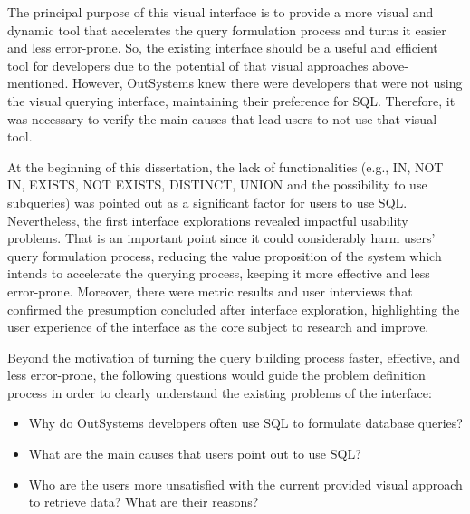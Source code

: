 The principal purpose of this visual interface is to provide a more visual and dynamic tool that accelerates the query formulation process and turns it easier and less error-prone. So, the existing interface should be a useful and efficient tool for developers due to the potential of that visual approaches above-mentioned. However, OutSystems knew there were developers that were not using the visual querying interface, maintaining their preference for SQL. Therefore, it was necessary to verify the main causes that lead users to not use that visual tool. 

At the beginning of this dissertation, the lack of functionalities (e.g., IN, NOT IN, EXISTS, NOT EXISTS, DISTINCT, UNION and the possibility to use subqueries) was pointed out as a significant factor for users to use SQL. Nevertheless, the first interface explorations revealed impactful usability problems. That is an important point since it could considerably harm users' query formulation process, reducing the value proposition of the system which intends to accelerate the querying process, keeping it more effective and less error-prone. Moreover, there were metric results and user interviews that confirmed the presumption concluded after interface exploration, highlighting the user experience of the interface as the core subject to research and improve.

Beyond the motivation of turning the query building process faster, effective, and less error-prone, the following questions would guide the problem definition process in order to clearly understand the existing problems of the interface:

\begin{itemize}
  \item Why do OutSystems developers often use \gls{SQL} to formulate database queries?
  \item What are the main causes that users point out to use \gls{SQL}?
  \item Who are the users more unsatisfied with the current provided visual approach to retrieve data? What are their reasons?
\end{itemize}



